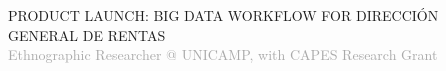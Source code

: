 \begin{cvtable}
%
	{
	}{
	 {\scriptsize PRODUCT LAUNCH: BIG DATA WORKFLOW FOR DIRECCIÓN GENERAL DE RENTAS} \\
        }  
% 
%
%
	{%
	\textcolor{darkgray}{%
    Ethnographic Researcher \newline
    @ {\scriptsize UNICAMP},
    with
    {C\scriptsize APES}
    Research Grant
	}}
	{
	}
	{
}
\end{cvtable}

